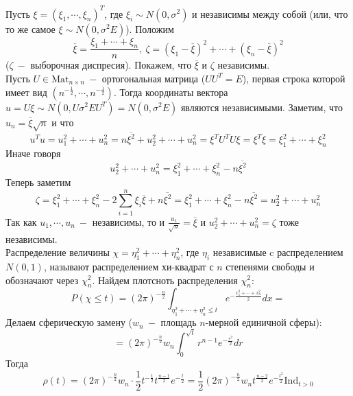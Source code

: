 \begin{example}
Пусть $\xi = \left(\xi_1, \cdots, \xi_n\right) ^ T$, где $\xi_i \sim N\left(0, \sigma ^ 2\right)$ и независимы между собой (или, что то же самое $\xi \sim N\left(0, \sigma ^ 2 E\right) $). Положим
\[
    \overline{\xi} = \frac{\xi_1 + \cdots + \xi_n}{n}, \ \zeta = \left(\xi_1 - \overline{\xi}\right) ^ 2
     + \cdots + \left(\xi_n - \overline{\xi}\right) ^ 2
\]
($\zeta \ - $ выборочная диспресия). Покажем, что $\overline{\xi}$ и $\zeta$ независимы. \\
Пусть $U \in \text{Mat}_{n \times n} \ - $ ортогональная матрица ($U U ^ T = E$), первая строка которой имеет вид $\left(n ^ {-\frac 1 2}, \cdots, n ^ {-\frac 1 2}\right)$. Тогда координаты вектора $u = U \xi \sim N\left(0, U \sigma ^ 2 E U ^ T\right) = N\left(0, \sigma ^ 2 E\right)$ являются независимыми. Заметим, что $u_{n}= \overline{\xi}\sqrt{n}$ и что
\[
    u ^ T u = u_1 ^ 2 + \cdots + u_n ^ 2 = n \overline{\xi ^ 2} + u_2 ^ 2 + \cdots + u_n ^ 2= \xi ^ T U ^ T U \xi = \xi ^ T \xi = \xi_1 ^ 2 + \cdots + \xi_n ^ 2
\]
Иначе говоря
\[
    u_2 ^ 2 + \cdots + u_n ^ 2 = \xi_1 ^ 2 + \cdots + \xi_n ^ 2 - n \overline{\xi ^ 2} 
\]
Теперь заметим
\[
    \zeta = \xi_1 ^ 2 + \cdots + \xi_n ^ 2 - 2 \sum_{i = 1}^{n} \xi_i \overline{\xi} + n \overline{\xi ^ 2}
    = \xi_1 ^ 2 + \cdots + \xi_n ^ 2 - n \overline{\xi ^ 2} = u_2 ^ 2 + \cdots + u_n ^ 2
\]
Так как $u_1, \cdots , u_n \ -$ независимы, то и $\frac{u_1}{\sqrt{n}} = \overline{\xi}$ и $u_2 ^ 2 + \cdots + u_n ^ 2 = \zeta$ тоже независимы. \\
Распределение величины $\chi = \eta_1^2 + \cdots + \eta_n^2$, где $\eta_i$ независимые c распределением $N\left(0, 1\right)$, называют распределением хи-квадрат с $n$ степенями свободы и обозначают через $\chi_{n} ^ 2$. 
Найдем плотсноть распределения $\chi_n ^ 2$:
\[
    P\left(\chi \leq t\right) = \left(2 \pi\right) ^ {-\frac{n}{2}} \int_{\eta_1 ^ 2 + \cdots + \eta_n ^ 2 \leq t} e ^ {-\frac{x_1 ^ 2 + \cdots + x_n ^ 2}{2}} dx = 
 \]
 Делаем сферическую замену ($w_n \ -$ площадь $n$-мерной единичной сферы):
 \[
     = \left(2 \pi\right) ^ {-\frac{n}{2}} w_n \int_{0}^{\sqrt{t}} r ^ {n - 1} e ^ {-\frac{ r ^ 2} 2} dr
 \]
 Тогда 
 \[
    \rho\left(t\right) = \left(2 \pi\right) ^ {-\frac{n}{2}} w_n \cdot \frac{1}{2} t ^ {-\frac{1}{2}} t ^ {\frac{n - 1}{2}} e ^ {-\frac{ t} 2} =  \frac{1}{2}  \left(2 \pi\right) ^ {-\frac{n}{2}} w_n  t ^ {\frac{n - 2}{2}} e ^ {-\frac{t ^ 2}{2}} \text{Ind}_{t > 0}
 \]
\end{example}

\clearpage
